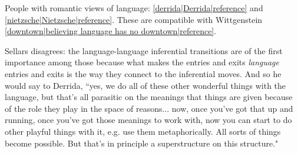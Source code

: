 People with romantic views of language: \ref{derrida|Derrida|reference} and \ref{nietzsche|Nietzsche|reference}. These are compatible with Wittgenstein \ref{downtown|believing language has no downtown|reference}.

Sellars disagrees: the language-language inferential transitions are of the first importance among those because what makes the entries and exits \emph{language} entries and exits is the way they connect to the inferential moves. And so he would say to Derrida, ``yes, we do all of these other wonderful things with the language, but that's all parasitic on the meanings that things are given because of the role they play in the space of reasons... now, once you've got that up and running, once you've got those meanings to work with, now you can start to do other playful things with it, e.g. use them metaphorically. All sorts of things become possible. But that's in principle a superstructure on this structure."
